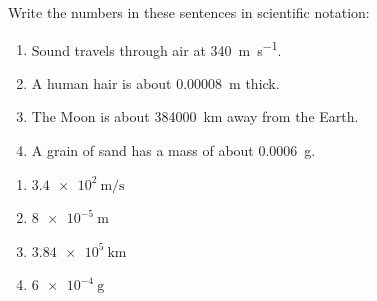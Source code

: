 \begin{exercise}
    Write the numbers in these sentences in scientific notation:
    \begin{enumerate}[label=\letraminuscula]
        \item Sound travels through air at \qty{340}{\m\per\s}.
        \item A human hair is about \qty{0.00008}{\m} thick.
        \item The Moon is about \qty{384000}{\km} away from the Earth.
        \item A grain of sand has a mass of about \qty{0.0006}{\g}.
    \end{enumerate}
    \begin{solu}
        \begin{enumerate}[label=\alph*)]
            \item \(\qty{3.4e2}{\m\per\s}\)
            \item \(\qty{8e-5}{\m}\)
            \item \(\qty{3.84e5}{\km}\)
            \item \(\qty{6e-4}{\g}\)
        \end{enumerate}
    \end{solu}
\end{exercise}

